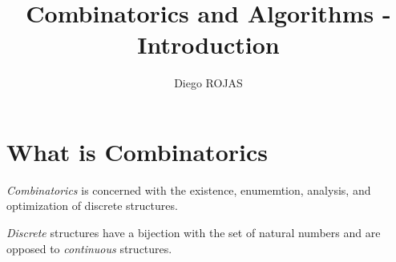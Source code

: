 \documentclass[12pt]{article}
\title{Combinatorics and Algorithms - Introduction}
\author{Diego ROJAS}
\begin{document}
\maketitle

\section{What is Combinatorics}

\textit{Combinatorics} is concerned with the existence, enumemtion, analysis, and optimization of discrete structures.

\textit{Discrete} structures have a bijection with the set of natural numbers and are opposed to \textit{continuous} structures.
\end{document}
